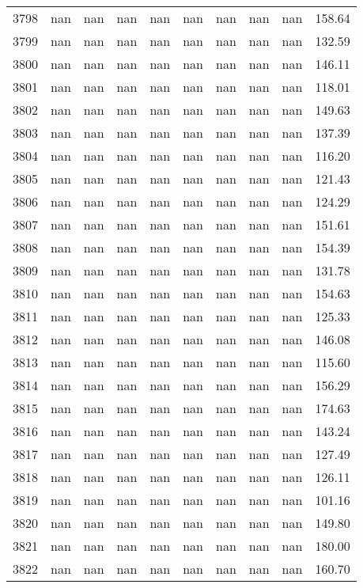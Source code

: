 \begin{tabular}{lrrrrrrrrr}
3798 & nan & nan & nan & nan & nan & nan & nan & nan & 158.64 \\
3799 & nan & nan & nan & nan & nan & nan & nan & nan & 132.59 \\
3800 & nan & nan & nan & nan & nan & nan & nan & nan & 146.11 \\
3801 & nan & nan & nan & nan & nan & nan & nan & nan & 118.01 \\
3802 & nan & nan & nan & nan & nan & nan & nan & nan & 149.63 \\
3803 & nan & nan & nan & nan & nan & nan & nan & nan & 137.39 \\
3804 & nan & nan & nan & nan & nan & nan & nan & nan & 116.20 \\
3805 & nan & nan & nan & nan & nan & nan & nan & nan & 121.43 \\
3806 & nan & nan & nan & nan & nan & nan & nan & nan & 124.29 \\
3807 & nan & nan & nan & nan & nan & nan & nan & nan & 151.61 \\
3808 & nan & nan & nan & nan & nan & nan & nan & nan & 154.39 \\
3809 & nan & nan & nan & nan & nan & nan & nan & nan & 131.78 \\
3810 & nan & nan & nan & nan & nan & nan & nan & nan & 154.63 \\
3811 & nan & nan & nan & nan & nan & nan & nan & nan & 125.33 \\
3812 & nan & nan & nan & nan & nan & nan & nan & nan & 146.08 \\
3813 & nan & nan & nan & nan & nan & nan & nan & nan & 115.60 \\
3814 & nan & nan & nan & nan & nan & nan & nan & nan & 156.29 \\
3815 & nan & nan & nan & nan & nan & nan & nan & nan & 174.63 \\
3816 & nan & nan & nan & nan & nan & nan & nan & nan & 143.24 \\
3817 & nan & nan & nan & nan & nan & nan & nan & nan & 127.49 \\
3818 & nan & nan & nan & nan & nan & nan & nan & nan & 126.11 \\
3819 & nan & nan & nan & nan & nan & nan & nan & nan & 101.16 \\
3820 & nan & nan & nan & nan & nan & nan & nan & nan & 149.80 \\
3821 & nan & nan & nan & nan & nan & nan & nan & nan & 180.00 \\
3822 & nan & nan & nan & nan & nan & nan & nan & nan & 160.70 \\

\end{tabular}

